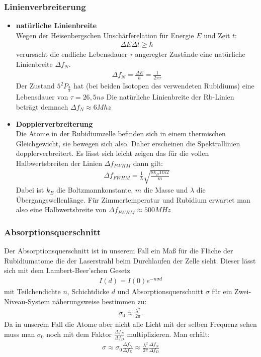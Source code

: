 \documentclass[12pt]{article}
\begin{document}
\subsubsection{Linienverbreiterung}
\begin{itemize}
 \item \textbf{natürliche Linienbreite} \\
    Wegen der Heisenbergschen Unschärferelation für Energie $E$ und Zeit $t$:
    \begin{align*}
    \Delta E \Delta t \geq \hbar
    \end{align*}
    verursacht die endliche Lebensdauer $\tau$ angeregter Zustände eine natürliche Linienbreite $\Delta f_N$.
    \begin{align}
    \label{natbreite}
    \Delta f_N  = \frac{\Delta E}{h} = \frac{1}{2 \pi \tau}
    \end{align}
    Der Zustand $5^2P_{\frac{3}{2}}$ hat (bei beiden Isotopen des verwendeten Rubidiums) eine Lebensdauer von $\tau =26,5 ns$
    Die natürliche Linienbreite der Rb-Linien beträgt demnach $\Delta f_N \approx 6 Mhz$
 \item \textbf{Dopplerverbreiterung} \\
    Die Atome in der Rubidiumzelle befinden sich in einem thermischen Gleichgewicht, sie bewegen sich also. Daher erscheinen die Spektrallinien dopplerverbreitert. Es lässt sich leicht zeigen das für die vollen Halbwertsbreiten der Linien $\Delta f_{FWHM}$ dann gilt:
    \begin{align}
    \label{FWHM}
     \Delta f_{FWHM} = \frac{1}{\lambda} \sqrt{\frac{8 k_B T ln 2}{m}}
    \end{align}
    Dabei ist $k_B$ die Boltzmannkonstante, $m$ die Masse und $\lambda$ die Übergangswellenlänge.
Für Zimmertemperatur und Rubidium erwartet man also eine Halbwertsbreite von $\Delta f_{FWHM} \approx 500 MHz$
\end{itemize}

\subsubsection{Absorptionsquerschnitt}
Der Absorptionsquerschnitt ist in unserem Fall ein Maß für die Fläche der Rubidiumatome die der Laserstrahl beim Durchlaufen der Zelle sieht.
Dieser lässt sich mit dem Lambert-Beer'schen Gesetz 
\begin{align}
 I(d) = I(0) e^{-n \sigma d}
 \label{lambert}
\end{align}
mit Teilchendichte $n$, Schichtdicke $d$ und Absorptionsquerschnitt $\sigma$
für ein Zwei-Niveau-System näherungsweise bestimmen zu:
\begin{align}
 \sigma_0 \approx \frac{\lambda^2}{2\pi}.
\end{align}
Da in unserem Fall die Atome aber nicht alle Licht mit der selben Frequenz sehen muss man $\sigma_0$ noch mit dem Faktor $\frac{\Delta f_N}{\Delta f_D}$ multiplizieren. Man erhält:
\begin{align}
 \sigma \approx \sigma_0 \frac{\Delta f_N}{\Delta f_D} \approx \frac{\lambda^2}{2\pi}\frac{\Delta f_N}{\Delta f_D}
\end{align}
\end{document}
